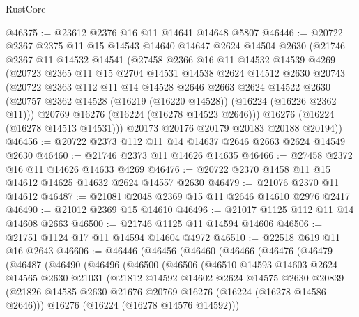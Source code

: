 \begin{lexlean}{RustCore}
\begin{coremodule}
@46375 := @23612 @2376 @16 @11 @14641 @14648 @5807
@46446 := @20722
    @2367
    @2375
    @11
    @15
    @14543
    @14640
    @14647
    @2624
    @14504
    @2630
    (@21746
      @2367
      @11
      @14532
      @14541
      (@27458
        @2366
        @16
        @11
        @14532
        @14539
        @4269
        (@20723
          @2365
          @11
          @15
          @2704
          @14531
          @14538
          @2624
          @14512
          @2630
          @20743
          (@20722
            @2363
            @112
            @11
            @14
            @14528
            @2646
            @2663
            @2624
            @14522
            @2630
            (@20757 @2362 @14528 (@16219 (@16220 @14528)) (@16224 (@16226 @2362 @11)))
            @20769
            @16276
            (@16224 (@16278 @14523 @2646)))
          @16276
          (@16224 (@16278 @14513 @14531)))
        @20173
        @20176
        @20179
        @20183
        @20188
        @20194))
@46456 := @20722 @2373 @112 @11 @14 @14637 @2646 @2663 @2624 @14549 @2630
@46460 := @21746 @2373 @11 @14626 @14635
@46466 := @27458 @2372 @16 @11 @14626 @14633 @4269
@46476 := @20722 @2370 @1458 @11 @15 @14612 @14625 @14632 @2624 @14557 @2630
@46479 := @21076 @2370 @11 @14612
@46487 := @21081 @2048 @2369 @15 @11 @2646 @14610 @2976 @2417
@46490 := @21012 @2369 @15 @14610
@46496 := @21017 @1125 @112 @11 @14 @14608 @2663
@46500 := @21746 @1125 @11 @14594 @14606
@46506 := @21751 @1124 @17 @11 @14594 @14604 @4972
@46510 := @22518 @619 @11 @16 @2643
@46606 := @46446
    (@46456
      (@46460
        (@46466
          (@46476
            (@46479
              (@46487
                (@46490
                  (@46496
                    (@46500
                      (@46506
                        (@46510
                          @14593
                          @14603
                          @2624
                          @14565
                          @2630
                          @21031
                          (@21812
                            @14592
                            @14602
                            @2624
                            @14575
                            @2630
                            @20839
                            (@21826
                              @14585
                              @2630
                              @21676
                              @20769
                              @16276
                              (@16224 (@16278 @14586 @2646)))
                            @16276
                            (@16224 (@16278 @14576 @14592)))

\end{coremodule}
\end{lexlean}
